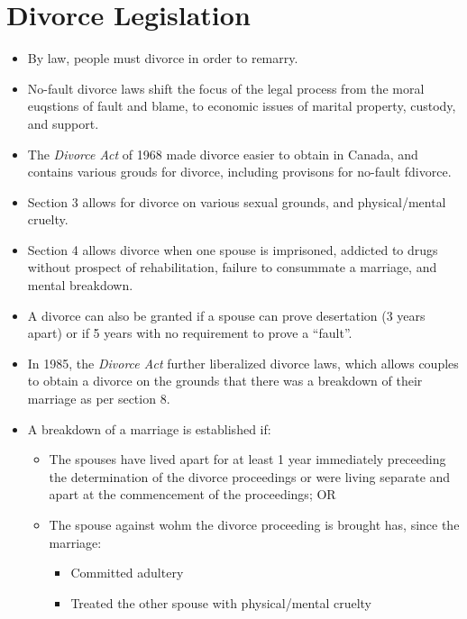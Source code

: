 \documentclass{article}
\begin{document}
\section{Divorce Legislation}
\begin{itemize}
    \item By law, people must divorce in order to remarry.
    \item No-fault divorce laws shift the focus of the legal process from the moral euqstions of fault and blame, to economic issues of marital property, custody, and support.
    \item The \emph{Divorce Act} of 1968 made divorce easier to obtain in Canada, and contains various grouds for divorce, including provisons for no-fault fdivorce.
    \item Section 3 allows for divorce on various sexual grounds, and physical/mental cruelty.
    \item Section 4 allows divorce when one spouse is imprisoned, addicted to drugs without prospect of rehabilitation, failure to consummate a marriage, and mental breakdown.
    \item A divorce can also be granted if a spouse can prove desertation (3 years apart) or if 5 years with no requirement to prove a ``fault''.
    \item In 1985, the \emph{Divorce Act} further liberalized divorce laws, which allows couples to obtain a divorce on the grounds that there was a breakdown of their marriage as per section 8.
    \item A breakdown of a marriage is established if:
        \begin{itemize}
            \item The spouses have lived apart for at least 1 year immediately preceeding the determination of the divorce proceedings or were living separate and apart at the commencement of the proceedings; OR
            \item The spouse against wohm the divorce proceeding is brought has, since the marriage:
                \begin{itemize}
                    \item Committed adultery
                    \item Treated the other spouse with physical/mental cruelty
                \end{itemize}
        \end{itemize}
\end{itemize}
\end{document}
